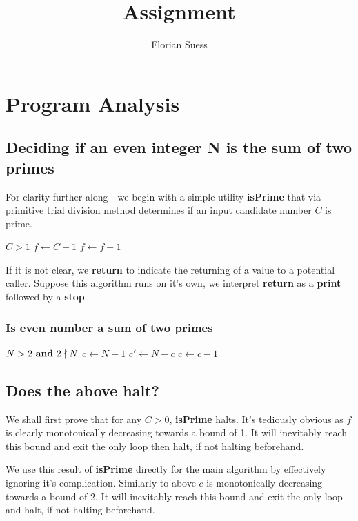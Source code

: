 \documentclass{article}
\title{Assignment}
\author{Florian Suess}
\begin{document}
\maketitle
\section{Program Analysis}
\subsection{Deciding if an even integer N is the sum of two primes}
For clarity further along - we begin with a simple utility \textbf{isPrime} that via primitive trial division method determines if an input candidate number $C$ is prime.
\begin{algorithmic}[1]
	\REQUIRE $C > 1$
	\ENDIF
	\STATE $f \leftarrow C - 1$
		\ENDIF
		\STATE $f \leftarrow f - 1$
	\ENDWHILE
\end{algorithmic}

If it is not clear, we \textbf{return} to indicate the returning of a value to a potential caller. Suppose this algorithm runs on it's own, we interpret \textbf{return} as a \textbf{print} followed by a \textbf{stop}.

\pagebreak

\subsubsection*{Is even number a sum of two primes}
\begin{algorithmic}[1]
	\REQUIRE $N > 2 \text{ \textbf{and} } 2 \nmid N$
	\STATE $c \leftarrow N - 1$
			\STATE $c' \leftarrow N - c$
			\ENDIF
		\ENDIF
		\STATE $c \leftarrow c - 1$
	\ENDWHILE
\end{algorithmic}


\subsection{Does the above halt?}
We shall first prove that for any $C > 0$, \textbf{isPrime} halts. It's tediously obvious as $f$ is clearly monotonically decreasing towards a bound of 1. It will inevitably reach this bound and exit the only loop then halt, if not halting beforehand.

We use this result of \textbf{isPrime} directly for the main algorithm by effectively ignoring it's complication. Similarly to above $c$ is monotonically decreasing towards a bound of 2. It will inevitably reach this bound and exit the only loop and halt, if not halting beforehand.
\end{document}
